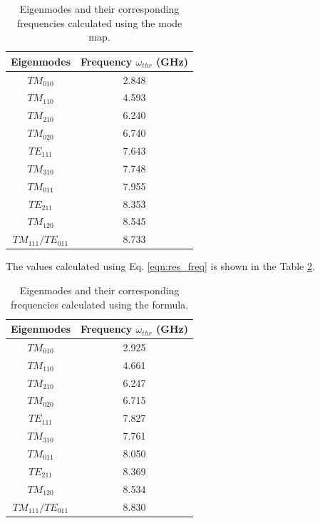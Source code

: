\documentclass[a4paper]{report}
\numberwithin{equation}{section}
\begin{document}
\begin{table}[htpb]
		\centering
		\caption{Eigenmodes and their corresponding frequencies calculated using the mode map.}
		\label{tab:mode_freq1}
		\begin{tabular}{|c|c|}
				\hline Eigenmodes &  Frequency $\omega_{thr}$ (GHz) \\
				\hline $TM_{010} $ & 2.848 \\
				\hline $TM_{110} $ & 4.593 \\
				\hline $TM_{210} $ & 6.240 \\
				\hline $TM_{020} $ & 6.740 \\ 
				\hline $TE_{111} $ & 7.643 \\ 
				\hline $TM_{310} $ & 7.748 \\
				\hline $TM_{011} $ & 7.955 \\ 
				\hline $TE_{211} $ & 8.353 \\
				\hline $TM_{120} $ & 8.545  \\
				\hline $TM_{111}/TE_{011}$ & 8.733 \\
				\hline		
		\end{tabular}
\end{table}

The values calculated using Eq. \ref{eqn:res_freq} is shown in the Table \ref{tab:mode_freq2}.

\begin{table}[htpb]
		\centering
		\caption{Eigenmodes and their corresponding frequencies calculated using the formula.}
		\label{tab:mode_freq2}
		\begin{tabular}{|c|c|}
				\hline Eigenmodes & Frequency $\omega_{thr}$ (GHz) \\ 
				\hline $TM_{010} $ & 2.925 \\
				\hline $TM_{110} $ & 4.661 \\
				\hline $TM_{210} $ & 6.247 \\
				\hline $TM_{020} $ & 6.715 \\ 
				\hline $TE_{111} $ & 7.827 \\ 
				\hline $TM_{310} $ & 7.761 \\
				\hline $TM_{011} $ & 8.050 \\ 
				\hline $TE_{211} $ & 8.369 \\
				\hline $TM_{120} $ & 8.534  \\
				\hline $TM_{111}/TE_{011}$ & 8.830 \\
				\hline	
		\end{tabular}
\end{table}
\end{document}
